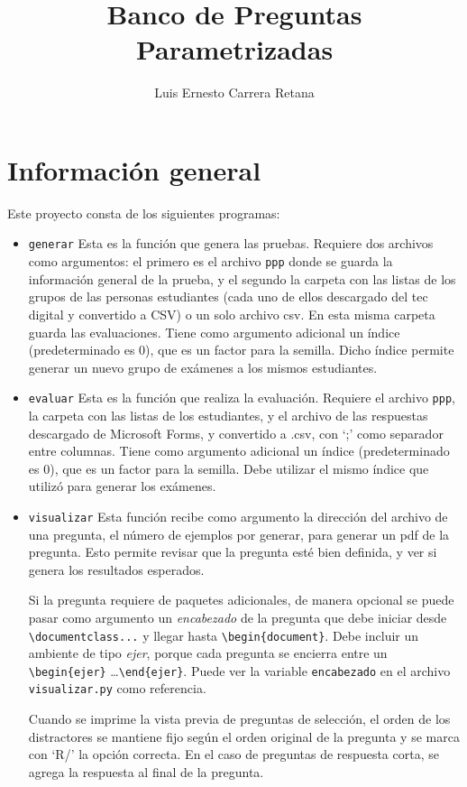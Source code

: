 \documentclass[12pt]{article}
\title{Banco de Preguntas Parametrizadas}
\author{Luis Ernesto Carrera Retana}
\theoremstyle{definition}
\begin{document}
\maketitle

\section{Información general}

Este proyecto consta de los siguientes programas:
\begin{itemize}
  \item \verb|generar| Esta es la función que genera las pruebas. Requiere dos archivos como argumentos: el primero es el archivo \verb|ppp| donde se guarda la información general de la prueba, y el segundo la carpeta con las listas de los grupos de las personas estudiantes (cada uno de ellos descargado del tec digital y convertido a CSV) o un solo archivo csv. En esta misma carpeta guarda las evaluaciones. Tiene como argumento adicional un índice (predeterminado es 0), que es un factor para la semilla. Dicho índice permite generar un nuevo grupo de exámenes a los mismos estudiantes.

  \item \verb|evaluar| Esta es la función que realiza la evaluación. Requiere el archivo \verb|ppp|, la carpeta con las listas de los estudiantes, y el archivo de las respuestas descargado de Microsoft Forms, y convertido a .csv, con `;' como separador entre columnas. Tiene como argumento adicional un índice (predeterminado es 0), que es un factor para la semilla. Debe utilizar el mismo índice que utilizó para generar los exámenes.

  \item \verb|visualizar| Esta función recibe como argumento la dirección del archivo de una pregunta, el número de ejemplos por generar, para generar un pdf de la pregunta. Esto permite revisar que la pregunta esté bien definida, y ver si genera los resultados esperados.

    Si la pregunta requiere de paquetes adicionales, de manera opcional se puede pasar como argumento un \emph{encabezado} de la pregunta que debe iniciar desde \verb|\documentclass...| y llegar hasta \verb|\begin{document}|. Debe incluir un ambiente de tipo \emph{ejer}, porque cada pregunta se encierra entre un \verb|\begin{ejer}| \dots \verb|\end{ejer}|. Puede ver la variable \verb|encabezado| en el archivo \verb|visualizar.py| como referencia.

    Cuando se imprime la vista previa de preguntas de selección, el orden de los distractores se mantiene fijo según el orden original de la pregunta y se marca con `R/' la opción correcta. En el caso de preguntas de respuesta corta, se agrega la respuesta al final de la pregunta.
\end{itemize}
\end{document}
